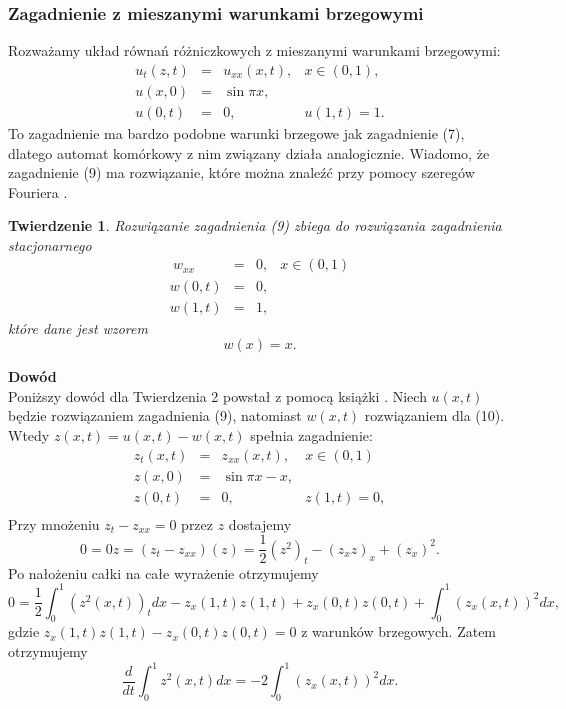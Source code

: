 \documentclass[a4paper,12pt]{article}
\newtheorem{tw}{Twierdzenie}
\begin{document}
\subsubsection{Zagadnienie z mieszanymi warunkami brzegowymi}
Rozważamy układ równań różniczkowych z mieszanymi warunkami brzegowymi:
\begin{equation}
  \begin{array}{llll}
    u_t(z,t)&=&u_{xx}(x,t),&x\in(0,1),\\
    u(x,0)&=&\sin\pi x,\\
    u(0,t)&=&0,&u(1,t)=1.
    \end{array}
\end{equation}
To zagadnienie ma bardzo podobne warunki brzegowe jak zagadnienie (7), dlatego automat komórkowy z nim związany działa analogicznie. Wiadomo, że zagadnienie (9) ma rozwiązanie, które można znaleźć przy pomocy szeregów Fouriera \cite{str}.
\begin{tw}
Rozwiązanie zagadnienia (9) zbiega do rozwiązania zagadnienia stacjonarnego
\begin{equation}
    \begin{array}{cccc}
    \ w_{xx}&=&0,& x\in(0,1)\\
    w(0,t)&=&0,\\
    w(1,t)&=&1,
    \end{array}
\end{equation}
które dane jest wzorem
$$w(x)=x.$$
\end{tw}
\textbf{Dowód}\\
Poniższy dowód dla Twierdzenia 2 powstał z pomocą książki \cite{str}.
Niech $u(x,t)$ będzie rozwiązaniem zagadnienia (9), natomiast $w(x,t)$ rozwiązaniem dla (10). Wtedy $z(x,t)=u(x,t)-w(x,t)$ spełnia zagadnienie:
\begin{equation}
    \begin{array}{cccc}
    z_t(x,t)&=&z_{xx}(x,t),& x\in(0,1)\\
    z(x,0)&=&\sin\pi x - x,\\
    z(0,t)&=&0, &z(1,t)=0,\\
       \end{array}
\end{equation}
Przy mnożeniu $z_t-z_{xx}=0$ przez $z$ dostajemy
$$0=0z=(z_t-z_{xx})(z)=\frac{1}{2}(z^2)_t-(z_xz)_x+(z_x)^2.$$
Po nałożeniu całki na całe wyrażenie otrzymujemy
$$0 = \frac{1}{2}\int_0^1(z^2(x,t))_tdx -  z_x(1,t)z(1,t) + z_x(0,t)z(0,t) +\int_0^1(z_x(x,t))^2dx,$$
gdzie $z_x(1,t)z(1,t) - z_x(0,t)z(0,t)=0$ z warunków brzegowych. Zatem otrzymujemy
$$\frac{d}{dt}\int_0^1z^2(x,t)dx=-2\int_0^1(z_x(x,t))^2dx.$$
\end{document}
